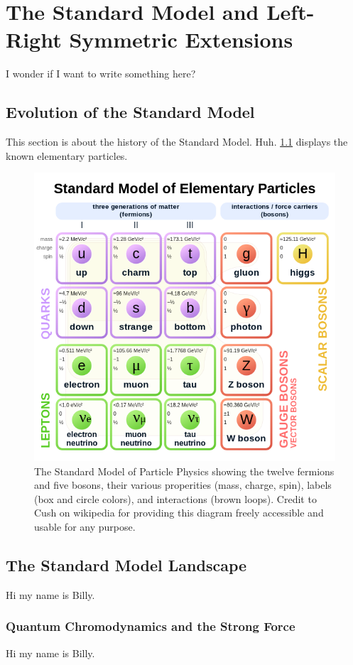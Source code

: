 \chapter{The Standard Model and Left-Right Symmetric Extensions}
\label{chapter:lrsm}

I wonder if I want to write something here?

\section{Evolution of the Standard Model}
\label{sec:lrsm:history}

This section is about the history of the Standard Model. Huh.
\cref{fig:sm} displays the known elementary particles.

\begin{figure}
    \centering
    \includegraphics[width=\textwidth]{figures/intro/Standard_Model_of_Elementary_Particles.svg.png}
    \caption{
      The Standard Model of Particle Physics showing the twelve fermions and five bosons,
      their various properities (mass, charge, spin), labels (box and circle colors),
      and interactions (brown loops). Credit to Cush on wikipedia for
      providing this diagram freely accessible and usable for any purpose.
    }
    \label{fig:sm}
  \end{figure}

\section{The Standard Model Landscape}

Hi my name is Billy.

\subsection{Quantum Chromodynamics and the Strong Force}

Hi my name is Billy.
